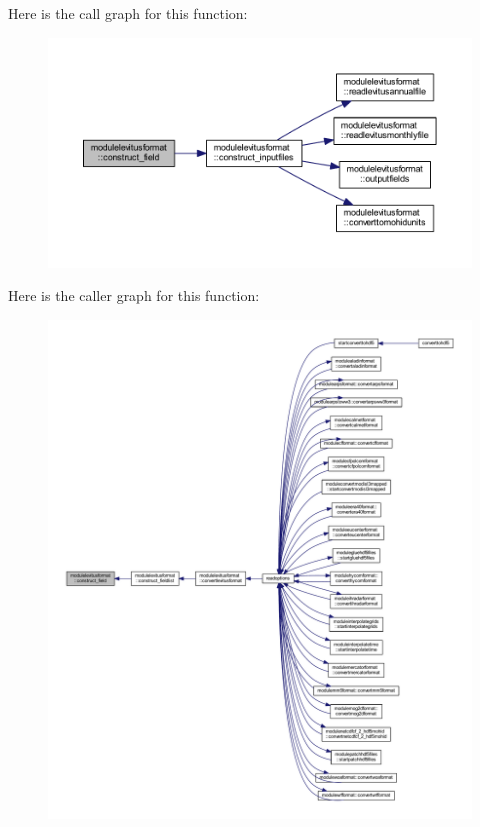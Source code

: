 Here is the call graph for this function\+:\nopagebreak
\begin{figure}[H]
\begin{center}
\leavevmode
\includegraphics[width=350pt]{namespacemodulelevitusformat_a1dfa75e5e2a006d4bcbca7bbb3e74ced_cgraph}
\end{center}
\end{figure}
Here is the caller graph for this function\+:\nopagebreak
\begin{figure}[H]
\begin{center}
\leavevmode
\includegraphics[width=350pt]{namespacemodulelevitusformat_a1dfa75e5e2a006d4bcbca7bbb3e74ced_icgraph}
\end{center}
\end{figure}
\mbox{\label{namespacemodulelevitusformat_a283a6fb7f680ba1855b1e20b95906146}} 
